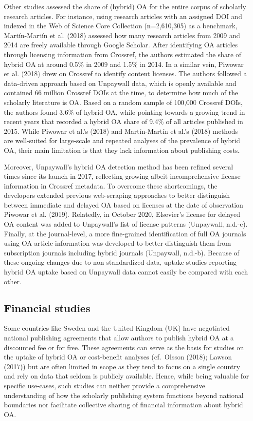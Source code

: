 \documentclass[a4paper,man,floatsintext,longtable,noextraspace,12pt]{apa6}
\begin{document}
Other studies assessed the share of (hybrid) OA for the entire corpus of
scholarly research articles. For instance, using research articles with
an assigned DOI and indexed in the Web of Science Core Collection
(n=2,610,305) as a benchmark, Martín-Martín et al. (2018) assessed how
many research articles from 2009 and 2014 are freely available through
Google Scholar. After identifying OA articles through licensing
information from Crossref, the authors estimated the share of hybrid OA
at around 0.5\% in 2009 and 1.5\% in 2014. In a similar vein, Piwowar et
al. (2018) drew on Crossref to identify content licenses. The authors
followed a data-driven approach based on Unpaywall data, which is openly
available and contained 66 million Crossref DOIs at the time, to
determine how much of the scholarly literature is OA. Based on a random
sample of 100,000 Crossref DOIs, the authors found 3.6\% of hybrid OA,
while pointing towards a growing trend in recent years that recorded a
hybrid OA share of 9.4\% of all articles published in 2015. While
Piwowar et al.'s (2018) and Martín-Martín et al.'s (2018) methods are
well-suited for large-scale and repeated analyses of the prevalence of
hybrid OA, their main limitation is that they lack information about
publishing costs.

Moreover, Unpaywall's hybrid OA detection method has been refined
several times since its launch in 2017, reflecting growing albeit
incomprehensive license information in Crossref metadata. To overcome
these shortcomings, the developers extended previous web-scraping
approaches to better distinguish between immediate and delayed OA based
on licenses at the date of observation Piwowar et al. (2019). Relatedly,
in October 2020, Elsevier's license for delayed OA content was added to
Unpaywall's list of license patterns (Unpaywall, n.d.-c). Finally, at
the journal-level, a more fine-grained identification of full OA
journals using OA article information was developed to better
distinguish them from subscription journals including hybrid journals
(Unpaywall, n.d.-b). Because of these ongoing changes due to
non-standardized data, uptake studies reporting hybrid OA uptake based
on Unpaywall data cannot easily be compared with each other.

\hypertarget{financial-studies}{%
\subsection{Financial studies}\label{financial-studies}}

Some countries like Sweden and the United Kingdom (UK) have negotiated
national publishing agreements that allow authors to publish hybrid OA
at a discounted fee or for free. These agreements can serve as the basis
for studies on the uptake of hybrid OA or cost-benefit analyses
(cf.~Olsson (2018); Lawson (2017)) but are often limited in scope as
they tend to focus on a single country and rely on data that seldom is
publicly available. Hence, while being valuable for specific use-cases,
such studies can neither provide a comprehensive understanding of how
the scholarly publishing system functions beyond national boundaries nor
facilitate collective sharing of financial information about hybrid OA.
\end{document}
